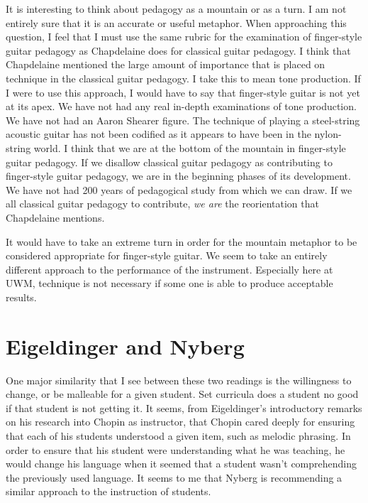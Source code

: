 \documentclass[12pt]{article}
\begin{document}
It is interesting to think about pedagogy as a mountain or as a
turn. I am not entirely sure that it is an accurate or useful
metaphor. When approaching this question, I feel that I must use the
same rubric for the examination of finger-style guitar pedagogy as
Chapdelaine does for classical guitar pedagogy. I think that
Chapdelaine mentioned the large amount of importance that is placed on
technique in the classical guitar pedagogy. I take this to mean tone
production. If I were to use this approach, I would have to say that
finger-style guitar is not yet at its apex. We have not had any real
in-depth examinations of tone production. We have not had an Aaron
Shearer figure. The technique of playing a steel-string acoustic
guitar has not been codified as it appears to have been in the
nylon-string world. I think that we are at the bottom of the mountain
in finger-style guitar pedagogy. If we disallow classical guitar
pedagogy as contributing to finger-style guitar pedagogy, we are in
the beginning phases of its development. We have not had 200 years of
pedagogical study from which we can draw. If we all classical guitar
pedagogy to contribute, \emph{we are} the reorientation that Chapdelaine
mentions.

It would have to take an extreme turn in order for the mountain
metaphor to be considered appropriate for finger-style guitar. We seem
to take an entirely different approach to the performance of the
instrument. Especially here at UWM, technique is not necessary if some
one is able to produce acceptable results.

\section{Eigeldinger and Nyberg}
\label{sec:eigeld-nyberg-kell}

One major similarity that I see between these two readings is the
willingness to change, or be malleable for a given student. Set
curricula does a student no good if that student is not getting it. It
seems, from Eigeldinger's introductory remarks on his research into
Chopin as instructor, that Chopin cared deeply for ensuring that each
of his students understood a given item, such as melodic phrasing. In
order to ensure that his student were understanding what he was
teaching, he would change his language when it seemed that a student
wasn't comprehending the previously used language. It seems to me that
Nyberg is recommending a similar approach to the instruction of
students.
\end{document}
